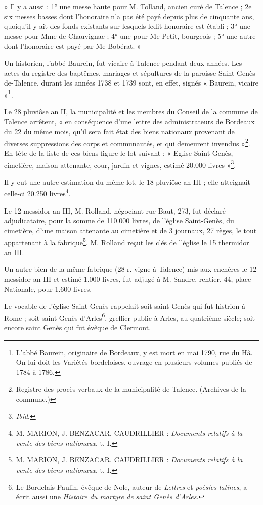 \documentclass[a4paper,11pt]{book}
\begin{document}
» Il y a aussi : 1° une messe haute pour M. Tolland, ancien curé de Talence ; 2e six messes basses dont l'honoraire n'a pas été payé depuis plus de cinquante ans, quoiqu'il y ait des fonds existants sur lesquels ledit honoraire est établi ; 3° une messe pour Mme de Chauvignac ; 4° une pour Me Petit, bourgeois ; 5° une autre dont l'honoraire est payé par Me Bobérat. »

Un historien, l'abbé Baurein, fut vicaire à Talence pendant deux années. Les actes du registre des baptêmes, mariages et sépultures de la paroisse Saint-Genès-de-Talence, durant les années 1738 et 1739 sont, en effet, signés « Baurein, vicaire »\footnote{L'abbé Baurein, originaire de Bordeaux, y est mort en mai 1790, rue du Hâ. On lui doit les Variétés bordeloises, ouvrage en plusieurs volumes publiés de 1784 à 1786.}.

Le 28 pluviôse an II, la municipalité et les membres du Conseil de la commune de Talence arrêtent, « en conséquence d'une lettre des administrateurs de Bordeaux du 22 du même mois, qu'il sera fait état des biens nationaux provenant de diverses suppressions des corps et communautés, et qui demeurent invendus »\footnote{Registre des procès-verbaux de la municipalité de Talence. (Archives de la commune.)}. En tête de la liste de ces biens figure le lot suivant : « Eglise Saint-Genès, cimetière, maison attenante, cour, jardin et vignes, estimé 20.000 livres »\footnote{\textit{Ibid}.}.

Il y eut une autre estimation du même lot, le 18 pluviôse an III ; elle atteignait celle-ci 20.250 livres\footnote{M. MARION, J. BENZACAR, CAUDRILLIER : \textit{Documents relatifs à la vente des biens nationaux}, t. I\ier{}.}.

Le 12 messidor an III, M. Rolland, négociant rue Baut, 273, fut déclaré adjudicataire, pour la somme de 110.000 livres, de l'église Saint-Genès, du cimetière, d'une maison attenante au cimetière et de 3 journaux, 27 règes, le tout appartenant à la fabrique\footnote{M. MARION, J. BENZACAR, CAUDRILLIER : \textit{Documents relatifs à la vente des biens nationaux}, t. I\ier{}.}. M. Rolland reçut les clés de l'église le 15 thermidor an III.

Un autre bien de la même fabrique (28 r. vigne à Talence) mis aux enchères le 12 messidor an III et estimé 1.000 livres, fut adjugé à M. Sandre, rentier, 44, place Nationale, pour 1.600 livres.

Le vocable de l'église Saint-Genès rappelait soit saint Genès qui fut histrion à Rome ; soit saint Genès d'Arles\footnote{Le Bordelais Paulin, évêque de Nole, auteur de \textit{Lettres} et \textit{poésies latines}, a écrit aussi une \textit{Histoire du martyre de saint Genès d'Arles}.}, greffier public à Arles, au quatrième siècle; soit encore saint Genès qui fut évêque de Clermont.
\end{document}
